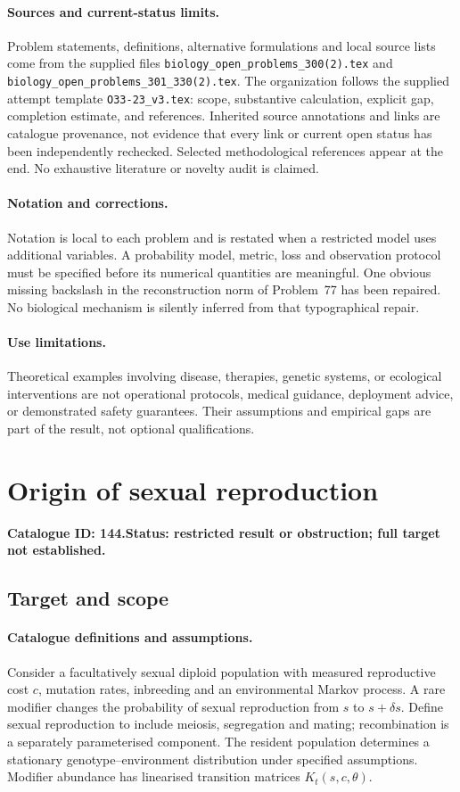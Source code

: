 \documentclass[11pt]{article}
\begin{document}
\paragraph{Sources and current-status limits.}
Problem statements, definitions, alternative formulations and local source lists
come from the supplied files
\texttt{biology\_open\_problems\_300(2).tex} and
\texttt{biology\_open\_problems\_301\_330(2).tex}.
The organization follows the supplied attempt template
\texttt{O33-23\_v3.tex}: scope, substantive calculation, explicit gap,
completion estimate, and references. Inherited source annotations and links are
catalogue provenance, not evidence that every link or current open status has
been independently rechecked. Selected methodological references appear at the
end. No exhaustive literature or novelty audit is claimed.

\paragraph{Notation and corrections.}
Notation is local to each problem and is restated when a restricted model uses
additional variables. A probability model, metric, loss and observation protocol
must be specified before its numerical quantities are meaningful. One obvious
missing backslash in the reconstruction norm of Problem~77 has been repaired.
No biological mechanism is silently inferred from that typographical repair.

\paragraph{Use limitations.}
Theoretical examples involving disease, therapies, genetic systems, or ecological
interventions are not operational protocols, medical guidance, deployment advice,
or demonstrated safety guarantees. Their assumptions and empirical gaps are part
of the result, not optional qualifications.

\setcounter{section}{143}
\section{Origin of sexual reproduction}
\label{prob:144}
\noindent\textbf{Catalogue ID: 144.}\quad \textbf{Status: restricted result or obstruction; full target not established.}
\subsection{Target and scope}
\paragraph{Catalogue definitions and assumptions.}
Consider a facultatively sexual diploid population with measured reproductive cost $c$, mutation rates, inbreeding and an environmental Markov process. A rare modifier changes the probability of sexual reproduction from $s$ to $s+\delta s$. Define sexual reproduction to include meiosis, segregation and mating; recombination is a separately parameterised component. The resident population determines a stationary genotype--environment distribution under specified assumptions. Modifier abundance has linearised transition matrices $K_t(s,c,\theta)$.
\end{document}
